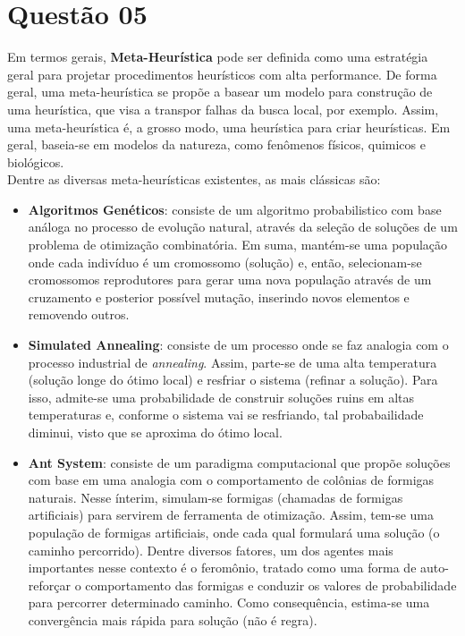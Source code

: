 	\section*{Questão 05}
	Em termos gerais, \textbf{Meta-Heurística} pode ser definida como uma estratégia geral para projetar procedimentos heurísticos com alta performance. De forma geral, uma meta-heurística se propõe a basear um modelo para construção de uma heurística, que visa a transpor falhas da busca local, por exemplo. Assim, uma meta-heurística é, a grosso modo, uma heurística para criar heurísticas. Em geral, baseia-se em modelos da natureza, como fenômenos físicos, quimicos e biológicos.\\
	Dentre as diversas meta-heurísticas existentes, as mais clássicas são:
	\begin{itemize}
		\item \textbf{Algoritmos Genéticos}: consiste de um algoritmo probabilistico com base análoga no processo de evolução natural, através da seleção de soluções de um problema de otimização combinatória. Em suma, mantém-se uma população onde cada indivíduo é um cromossomo (solução) e, então, selecionam-se cromossomos reprodutores para gerar uma nova população através de um cruzamento e posterior possível mutação, inserindo novos elementos e removendo outros.
		\item \textbf{Simulated Annealing}: consiste de um processo onde se faz analogia com o processo industrial de \textit{annealing}. Assim, parte-se de uma alta temperatura (solução longe do ótimo local) e resfriar o sistema (refinar a solução). Para isso, admite-se uma probabilidade de construir soluções ruins em altas temperaturas e, conforme o sistema vai se resfriando, tal probabailidade diminui, visto que se aproxima do ótimo local.
		\item \textbf{Ant System}: consiste de um paradigma computacional que propõe soluções com base em uma analogia com o comportamento de colônias de formigas naturais. Nesse ínterim, simulam-se formigas (chamadas de formigas artificiais) para servirem de ferramenta de otimização. Assim, tem-se uma população de formigas artificiais, onde cada qual formulará uma solução (o caminho percorrido). Dentre diversos fatores, um dos agentes mais importantes nesse contexto é o feromônio, tratado como uma forma de auto-reforçar o comportamento das formigas e conduzir os valores de probabilidade para percorrer determinado caminho. Como consequência, estima-se uma convergência mais rápida para solução (não é regra).
	\end{itemize}

	
	


